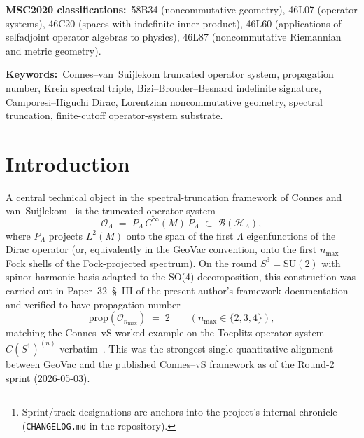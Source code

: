 \documentclass[11pt,a4paper]{article}
\theoremstyle{plain}
\theoremstyle{definition}
\newcommand{\nmax}{n_{\max}}
\newcommand{\sthree}{S^{3}}
\newcommand{\Hilb}{\mathcal{H}}
\newcommand{\Op}{\mathcal{O}}
\newcommand{\Bcal}{\mathcal{B}}
\newcommand{\SU}{\mathrm{SU}}
\newcommand{\JL}{J_L}
\newcommand{\prop}{\mathrm{prop}}
\begin{document}
\begin{abstract}
$\JL$, so $\Op^{L,+} = \Op^L$ exactly. The natural Krein-positive
seminorm device is annihilated (Paper~45), so any remaining route has
to carry the signature somewhere other than the seminorm (the former
Sprint L3b\footnote{Sprint/track designations are anchors into the project's internal chronicle (\texttt{CHANGELOG.md} in the repository).} propinquity route is descoped with Paper~45, 2026-06-09;\ see~\S~\ref{sec:open}). Honest scope:
this paper closes the operator-system substrate at finite cutoff;
Lorentzian-propinquity convergence is descoped (Paper~45). No
published Lorentzian propinquity construction exists as of May 2026:\
Latr\'emoli\`ere~2017/2023~\cite{latremoliere_metric_st_2017} and
Leimbach--van~Suijlekom~2024~\cite{leimbach_vs2024} are strictly
Riemannian.
\end{abstract}

\bigskip\noindent
\textbf{MSC2020 classifications:}\ 58B34 (noncommutative geometry),
46L07 (operator systems), 46C20 (spaces with indefinite inner product),
46L60 (applications of selfadjoint operator algebras to physics),
46L87 (noncommutative Riemannian and metric geometry).

\medskip\noindent
\textbf{Keywords:}\ Connes--van~Suijlekom truncated operator system,
propagation number, Krein spectral triple, Bizi--Brouder--Besnard
indefinite signature, Camporesi--Higuchi Dirac, Lorentzian
noncommutative geometry, spectral truncation, finite-cutoff
operator-system substrate.

\section{Introduction}\label{sec:intro}

A central technical object in the spectral-truncation framework of
Connes and van~Suijlekom~\cite{connes_vs2021} is the truncated operator
system
\begin{equation}\label{eq:cvs_riem}
   \Op_\Lambda \;=\; P_\Lambda\, C^\infty(M)\, P_\Lambda
   \;\subset\; \Bcal(\Hilb_\Lambda),
\end{equation}
where $P_\Lambda$ projects $L^2(M)$ onto the span of the first
$\Lambda$ eigenfunctions of the Dirac operator (or, equivalently in
the GeoVac convention, onto the first $\nmax$ Fock shells of the
Fock-projected spectrum). On the round $\sthree = \SU(2)$ with
spinor-harmonic basis adapted to the SO(4) decomposition, this
construction was carried out in Paper~32~\S~III of the present
author's framework documentation and verified to have propagation
number
\begin{equation}\label{eq:prop_riem}
   \prop(\Op_{\nmax}) \;=\; 2 \qquad (\nmax \in \{2, 3, 4\}),
\end{equation}
matching the Connes--vS worked example on the Toeplitz operator
system $C(S^1)^{(n)}$ verbatim~\cite{connes_vs2021}. This was the
strongest single quantitative alignment between GeoVac and the
published Connes--vS framework as of the Round-2 sprint
(2026-05-03).
\end{document}

